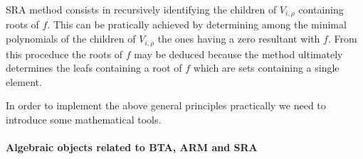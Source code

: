 \documentclass{article}
\newcommand{\qq}{q}
\newcommand{\nn}{n}
\begin{document}
\medskip
 
SRA method consists in recursively identifying the children of $V_{i,\rho}$ containing roots of $f$. 
This can be pratically achieved by determining among the minimal polynomials of the children of 
$V_{i,\rho}$ the ones having a zero resultant with $f$. %
From this proceduce the roots of $f$ may be deduced because the method ultimately determines the leafs containing a root of $f$ which are sets containing a single element.



In order to implement the above general principles practically we need to introduce some 
mathematical tools.


\paragraph{Algebraic objects related to BTA, ARM and SRA}
\end{document}
